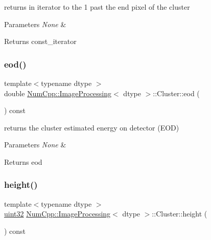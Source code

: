 returns in iterator to the 1 past the end pixel of the cluster


\begin{DoxyParams}{Parameters}
{\em None} & \\
\hline
\end{DoxyParams}
\begin{DoxyReturn}{Returns}
const\+\_\+iterator 
\end{DoxyReturn}
\mbox{\label{class_num_cpp_1_1_image_processing_1_1_cluster_a94b1532f666e9413fe34406763ef8173}} 
\subsubsection{\texorpdfstring{eod()}{eod()}}
{\footnotesize\ttfamily template$<$typename dtype $>$ \\
double \mbox{\hyperlink{class_num_cpp_1_1_image_processing}{Num\+Cpp\+::\+Image\+Processing}}$<$ dtype $>$\+::Cluster\+::eod (\begin{DoxyParamCaption}{ }\end{DoxyParamCaption}) const\hspace{0.3cm}{\ttfamily [inline]}}

returns the cluster estimated energy on detector (E\+OD)


\begin{DoxyParams}{Parameters}
{\em None} & \\
\hline
\end{DoxyParams}
\begin{DoxyReturn}{Returns}
eod 
\end{DoxyReturn}
\mbox{\label{class_num_cpp_1_1_image_processing_1_1_cluster_a342ed01e86ca4394d63c725391ebaa3b}} 
\subsubsection{\texorpdfstring{height()}{height()}}
{\footnotesize\ttfamily template$<$typename dtype $>$ \\
\mbox{\hyperlink{namespace_num_cpp_a36f388e948380413c63011cab9b7fbd5}{uint32}} \mbox{\hyperlink{class_num_cpp_1_1_image_processing}{Num\+Cpp\+::\+Image\+Processing}}$<$ dtype $>$\+::Cluster\+::height (\begin{DoxyParamCaption}{ }\end{DoxyParamCaption}) const\hspace{0.3cm}{\ttfamily [inline]}}

